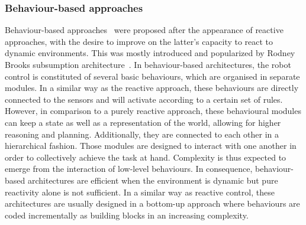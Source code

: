 

    \subsubsection{Behaviour-based approaches}

      Behaviour-based approaches~\parencite{Arkin1998a} were proposed after the appearance of reactive approaches, with the desire to improve on the latter's capacity to react to dynamic environments. This was mostly introduced and popularized by Rodney Brooks subsumption architecture~\parencite{Brooks1986}. In behaviour-based architectures, the robot control is constituted of several basic behaviours, which are organised in separate modules. In a similar way as the reactive approach, these behaviours are directly connected to the sensors and will activate according to a certain set of rules. However, in comparison to a purely reactive approach, these behavioural modules can keep a state as well as a representation of the world, allowing for higher reasoning and planning. Additionally, they are connected to each other in a hierarchical fashion.   Those modules are designed to interact with one another in order to collectively achieve the task at hand. Complexity is thus expected to emerge from the interaction of low-level behaviours. In consequence, behaviour-based architectures are efficient when the environment is dynamic but pure reactivity alone is not sufficient. In a similar way as reactive control, these architectures are usually designed in a bottom-up approach where behaviours are coded incrementally as building blocks in an increasing complexity. 

